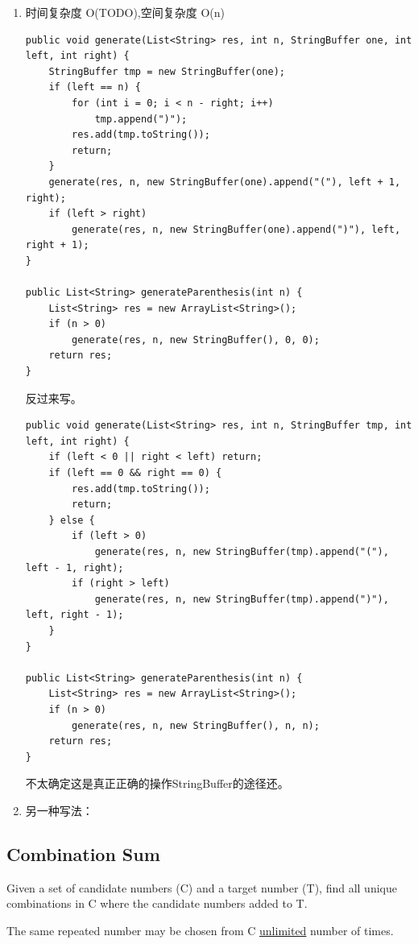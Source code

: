 \documentclass[12pt]{book}
\begin{document}
\begin{enumerate}
\item 时间复杂度 O(TODO),空间复杂度 O(n)
\label{sec-11-1-3-1}
\lstset{language=java,label= ,caption= ,numbers=none}
\begin{lstlisting}
public void generate(List<String> res, int n, StringBuffer one, int left, int right) {
    StringBuffer tmp = new StringBuffer(one);
    if (left == n) {
        for (int i = 0; i < n - right; i++)
            tmp.append(")");
        res.add(tmp.toString());
        return;
    }
    generate(res, n, new StringBuffer(one).append("("), left + 1, right);
    if (left > right)
        generate(res, n, new StringBuffer(one).append(")"), left, right + 1);
}

public List<String> generateParenthesis(int n) {
    List<String> res = new ArrayList<String>();
    if (n > 0)
        generate(res, n, new StringBuffer(), 0, 0);
    return res;
}
\end{lstlisting}

反过来写。
\lstset{language=java,label= ,caption= ,numbers=none}
\begin{lstlisting}
public void generate(List<String> res, int n, StringBuffer tmp, int left, int right) {
    if (left < 0 || right < left) return;
    if (left == 0 && right == 0) { 
        res.add(tmp.toString());
        return;
    } else {
        if (left > 0) 
            generate(res, n, new StringBuffer(tmp).append("("), left - 1, right);
        if (right > left) 
            generate(res, n, new StringBuffer(tmp).append(")"), left, right - 1);
    }
}

public List<String> generateParenthesis(int n) {
    List<String> res = new ArrayList<String>();
    if (n > 0) 
        generate(res, n, new StringBuffer(), n, n);
    return res;
}
\end{lstlisting}
不太确定这是真正正确的操作StringBuffer的途径还。

\item 另一种写法：
\label{sec-11-1-3-2}
\end{enumerate}
\subsection{Combination Sum}
\label{sec-11-1-4}
Given a set of candidate numbers (C) and a target number (T), find all unique combinations in C where the candidate numbers added to T.

The same repeated number may be chosen from C \uline{unlimited} number of times.
\end{document}
